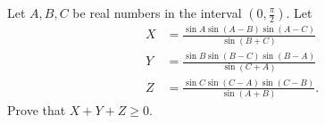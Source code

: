 Let $A, B, C$ be real numbers in the interval $\left(0,\frac{\pi}{2}\right)$. Let
\begin{align*}
	X &= \frac{\sin A\sin (A-B)\sin (A-C)}{\sin (B+C)} \\
	Y &= \frac{\sin B\sin(B-C)\sin (B-A)}{\sin (C+A)} \\
	Z &= \frac{\sin C\sin (C-A)\sin (C-B)}{\sin (A+B)}.
\end{align*}
Prove that $X+Y+Z \geq 0$.